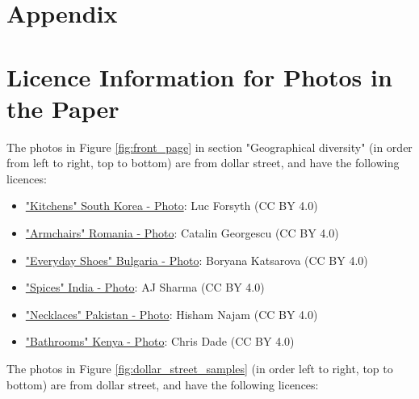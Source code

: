 \documentclass[10pt,twocolumn,letterpaper]{article}
\begin{document}
{\small


}

\clearpage

\section{Appendix}

\appendix

\section{Licence Information for Photos in the Paper}

\newcommand{\imagelicence}[3]{{\underline{"#1" #2 - Photo}: #3}}

\noindent The photos in Figure \ref{fig:front_page} in section "Geographical diversity" (in order from left to right, top to bottom) are from dollar street, and have the following licences:

{\small
\begin{itemize}
    \item \imagelicence{Kitchens}{South Korea}{Luc Forsyth (CC BY 4.0)}
    \item \imagelicence{Armchairs}{Romania}{Catalin Georgescu (CC BY 4.0)}
    \item \imagelicence{Everyday Shoes}{Bulgaria}{Boryana Katsarova (CC BY 4.0)}
    \item \imagelicence{Spices}{India}{AJ Sharma (CC BY 4.0)}
    \item \imagelicence{Necklaces}{Pakistan}{Hisham Najam (CC BY 4.0)}
    \item \imagelicence{Bathrooms}{Kenya}{Chris Dade (CC BY 4.0)}
\end{itemize}
}
\noindent The photos in Figure \ref{fig:dollar_street_samples} (in order left to right, top to bottom) are from dollar street, and have the following licences:
\end{document}
